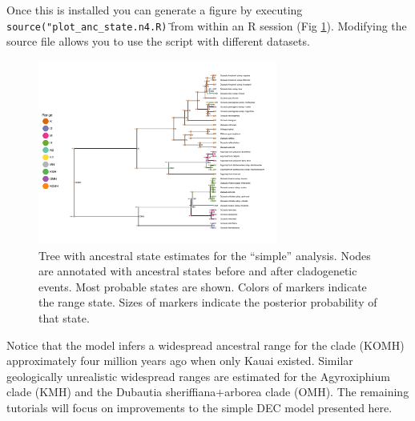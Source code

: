 Once this is installed you can generate a figure by executing {\tt source("plot\_anc\_state.n4.R\")} from within an R session (Fig \ref{fig:simple_RevGadgets_ase}).
Modifying the source file allows you to use the script with different datasets.

\begin{figure}[!ht]
\centering
\includegraphics[width=0.7\textwidth]{figures/fig_simple_RevGadgets_ase.pdf}
\caption{Tree with ancestral state estimates for the ``simple'' analysis. Nodes are annotated with ancestral states before and after cladogenetic events. Most probable states are shown. Colors of markers indicate the range state. Sizes of markers indicate the posterior probability of that state. }
\label{fig:simple_RevGadgets_ase}
\end{figure}

Notice that the model infers a widespread ancestral range for the clade (KOMH) approximately four million years ago when only Kauai existed.
Similar geologically unrealistic widespread ranges are estimated for the Agyroxiphium clade (KMH) and the Dubautia sheriffiana+arborea clade (OMH).
The remaining tutorials will focus on improvements to the simple DEC model presented here.

\newpage
